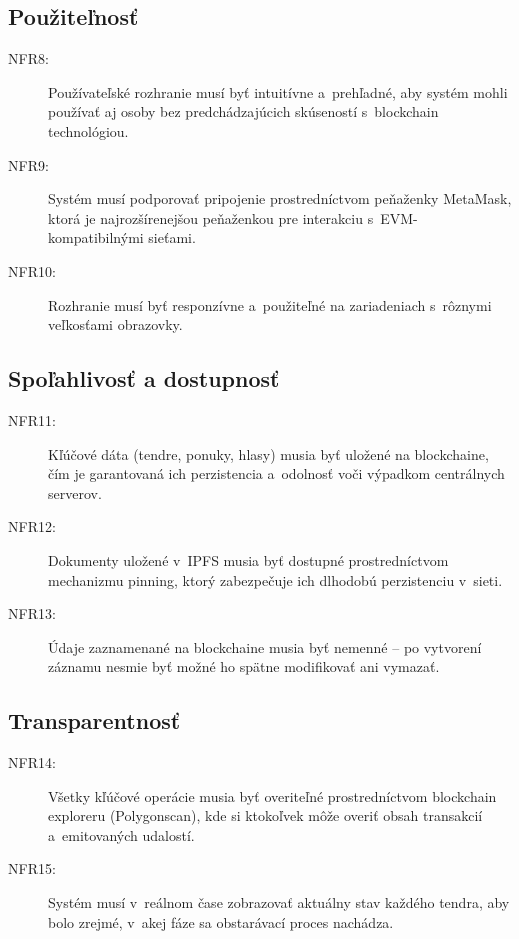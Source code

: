 \subsection{Použiteľnosť}
\begin{description}
    \item[NFR8:] Používateľské rozhranie musí byť intuitívne
    a~prehľadné, aby systém mohli používať aj osoby bez predchádzajúcich
    skúseností s~blockchain technológiou.

    \item[NFR9:] Systém musí podporovať pripojenie prostredníctvom
    peňaženky MetaMask, ktorá je najrozšírenejšou peňaženkou
    pre interakciu s~EVM-kompatibilnými sieťami.

    \item[NFR10:] Rozhranie musí byť responzívne a~použiteľné na
    zariadeniach s~rôznymi veľkosťami obrazovky.
\end{description}

\subsection{Spoľahlivosť a dostupnosť}
\begin{description}
    \item[NFR11:] Kľúčové dáta (tendre, ponuky, hlasy) musia byť
    uložené na blockchaine, čím je garantovaná ich perzistencia
    a~odolnosť voči výpadkom centrálnych serverov.

    \item[NFR12:] Dokumenty uložené v~IPFS musia byť dostupné
    prostredníctvom mechanizmu pinning, ktorý zabezpečuje ich
    dlhodobú perzistenciu v~sieti.

    \item[NFR13:] Údaje zaznamenané na blockchaine musia byť nemenné
    -- po vytvorení záznamu nesmie byť možné ho spätne modifikovať
    ani vymazať.
\end{description}

\subsection{Transparentnosť}
\begin{description}
    \item[NFR14:] Všetky kľúčové operácie musia byť overiteľné
    prostredníctvom blockchain exploreru (Polygonscan), kde si
    ktokoľvek môže overiť obsah transakcií a~emitovaných udalostí.

    \item[NFR15:] Systém musí v~reálnom čase zobrazovať aktuálny stav
    každého tendra, aby bolo zrejmé, v~akej fáze sa obstarávací
    proces nachádza.
\end{description}

